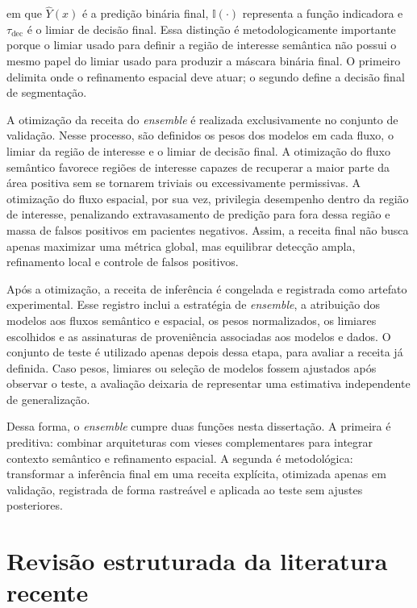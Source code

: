 em que $\hat{Y}(x)$ é a predição binária final, $\mathbb{I}(\cdot)$ representa a
função indicadora e $\tau_{\mathrm{dec}}$ é o limiar de decisão final. Essa
distinção é metodologicamente importante porque o limiar usado para definir a
região de interesse semântica não possui o mesmo papel do limiar usado para
produzir a máscara binária final. O primeiro delimita onde o refinamento espacial
deve atuar; o segundo define a decisão final de segmentação.

A otimização da receita do \textit{ensemble} é realizada exclusivamente no
conjunto de validação. Nesse processo, são definidos os pesos dos modelos em
cada fluxo, o limiar da região de interesse e o limiar de decisão final. A
otimização do fluxo semântico favorece regiões de interesse capazes de recuperar
a maior parte da área positiva sem se tornarem triviais ou excessivamente
permissivas. A otimização do fluxo espacial, por sua vez, privilegia desempenho
dentro da região de interesse, penalizando extravasamento de predição para fora
dessa região e massa de falsos positivos em pacientes negativos. Assim, a
receita final não busca apenas maximizar uma métrica global, mas equilibrar
detecção ampla, refinamento local e controle de falsos positivos.

Após a otimização, a receita de inferência é congelada e registrada como
artefato experimental. Esse registro inclui a estratégia de \textit{ensemble}, a
atribuição dos modelos aos fluxos semântico e espacial, os pesos normalizados,
os limiares escolhidos e as assinaturas de proveniência associadas aos modelos e
dados. O conjunto de teste é utilizado apenas depois dessa etapa, para avaliar a
receita já definida. Caso pesos, limiares ou seleção de modelos fossem ajustados
após observar o teste, a avaliação deixaria de representar uma estimativa
independente de generalização.

Dessa forma, o \textit{ensemble} cumpre duas funções nesta dissertação. A
primeira é preditiva: combinar arquiteturas com vieses complementares para
integrar contexto semântico e refinamento espacial. A segunda é metodológica:
transformar a inferência final em uma receita explícita, otimizada apenas em
validação, registrada de forma rastreável e aplicada ao teste sem ajustes
posteriores.

\section{Revisão estruturada da literatura recente}
\label{sec:revisao_literatura_recente}

